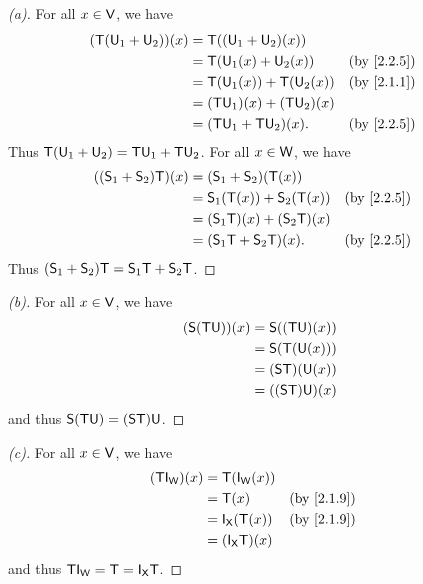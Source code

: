 \begin{proof}[(a)]
  For all \(x \in \mathsf{V}\), we have
  \begin{align*}
    (\T(\U_1 + \U_2))(x) & = \T((\U_1 + \U_2)(x))                        \\
                         & = \T(\U_1(x) + \U_2(x))       &  & \by{2.2.5} \\
                         & = \T(\U_1(x)) + \T(\U_2(x))   &  & \by{2.1.1} \\
                         & = (\T \U_1)(x) + (\T \U_2)(x)                 \\
                         & = (\T \U_1 + \T \U_2)(x).     &  & \by{2.2.5}
  \end{align*}
  Thus \(\mathsf{T}(\mathsf{U}_1 + \mathsf{U}_2) = \mathsf{T} \mathsf{U}_1 + \mathsf{T} \mathsf{U}_2\).
  For all \(x \in \mathsf{W}\), we have
  \begin{align*}
    ((\vs{S}_1 + \vs{S}_2) \T)(x) & = (\vs{S}_1 + \vs{S}_2)(\T(x))                        \\
                                  & = \vs{S}_1(\T(x)) + \vs{S}_2(\T(x))   &  & \by{2.2.5} \\
                                  & = (\vs{S}_1 \T)(x) + (\vs{S}_2 \T)(x)                 \\
                                  & = (\vs{S}_1 \T + \vs{S}_2 \T)(x).     &  & \by{2.2.5}
  \end{align*}
  Thus \((\mathsf{S}_1 + \mathsf{S}_2) \mathsf{T} = \mathsf{S}_1 \mathsf{T} + \mathsf{S}_2 \mathsf{T}\).
\end{proof}

\begin{proof}[(b)]
  For all \(x \in \mathsf{V}\), we have
  \begin{align*}
    (\mathsf{S} (\mathsf{T} \mathsf{U}))(x) & = \mathsf{S}((\mathsf{T} \mathsf{U})(x))  \\
                        & = \mathsf{S}(\mathsf{T}(\mathsf{U}(x)))   \\
                        & = (\mathsf{S} \mathsf{T})(\mathsf{U}(x))  \\
                        & = ((\mathsf{S} \mathsf{T}) \mathsf{U})(x)
  \end{align*}
  and thus \(\mathsf{S} (\mathsf{T} \mathsf{U}) = (\mathsf{S} \mathsf{T}) \mathsf{U}\).
\end{proof}

\begin{proof}[(c)]
  For all \(x \in \mathsf{V}\), we have
  \begin{align*}
    (\T \IT[\W])(x) & = \T(\IT[\W](x))                      \\
                    & = \T(x)               &  & \by{2.1.9} \\
                    & = \IT[\vs{X}](\T(x))  &  & \by{2.1.9} \\
                    & = (\IT[\vs{X}] \T)(x)
  \end{align*}
  and thus \(\T \IT[\W] = \T = \IT[\vs{X}] \T\).
\end{proof}

